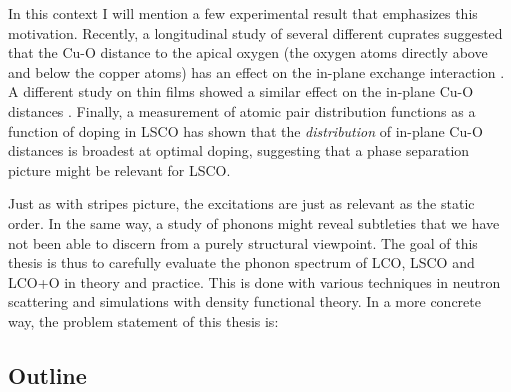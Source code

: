 In this context I will mention a few experimental result that emphasizes this motivation. Recently, a longitudinal study of several different cuprates suggested that the Cu-O distance to the apical oxygen (the oxygen atoms directly above and below the copper atoms) has an effect on the in-plane exchange interaction \cite{Peng2017}. A different study on thin films showed a similar effect on the in-plane Cu-O distances \cite{Ivashko2019}. Finally, a measurement of atomic pair distribution functions as a function of doping in LSCO has shown that the \emph{distribution} of in-plane Cu-O distances is broadest at optimal doping, suggesting that a phase separation picture might be relevant for LSCO.

Just as with stripes picture, the excitations are just as relevant as the static order. In the same way, a study of phonons might reveal subtleties that we have not been able to discern from a purely structural viewpoint. The goal of this thesis is thus to carefully evaluate the phonon spectrum of LCO, LSCO and LCO+O in theory and practice. This is done with various techniques in neutron scattering and simulations with density functional theory. In a more concrete way, the problem statement of this thesis is:

\begin{quote}
\end{quote}

\subsection{Outline}
